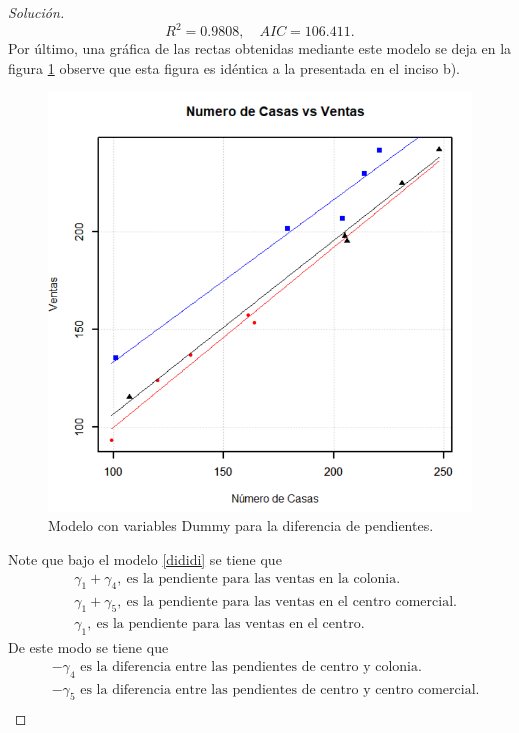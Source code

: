 \documentclass[10.5pt,notitlepage]{article}
\newenvironment{solucion}
  {\begin{proof}[Solución]}
  {\end{proof}}
\theoremstyle{plain}
\begin{document}
\begin{solucion}
\begin{equation}\label{AIC RRRR2}
    R^2 = 0.9808, \quad AIC = 106.411.
\end{equation}
Por último, una gráfica de las rectas obtenidas mediante este modelo se deja en la figura \ref{fig:23} observe que esta figura es idéntica a la presentada en el inciso b).
\begin{figure}[htb]
 \centering
 \includegraphics[scale = 0.65]{dembelé.png}
 \caption{Modelo con variables Dummy para la diferencia de pendientes.}
\label{fig:23}
\end{figure}
Note que bajo el modelo \eqref{dididi} se tiene que 
\begin{align*}
    &\gamma_1 +\gamma_4, \ \text{es la pendiente para las ventas en la colonia.} \\
    &\gamma_1 + \gamma_5, \ \text{es la pendiente para las ventas en el centro comercial.}\\ 
    &\gamma_1, \ \text{es la pendiente para las ventas en el centro.} 
\end{align*}
De este modo se tiene que 
\begin{align*}
    &-\gamma_4 \text{ es la diferencia entre las pendientes de centro y colonia}.\\
    &-\gamma_5 \text{ es la diferencia entre las pendientes de centro y centro comercial}.\\

\end{align*}
\end{solucion}
\end{document}
